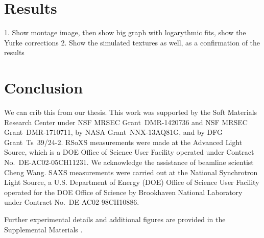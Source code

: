\documentclass[superscriptaddress,floatfix,draft,prl]{revtex4-1}
\begin{document}
\section{Results}
1. Show montage image, then show big graph with logarythmic fits, show the Yurke
corrections
2. Show the simulated textures as well, as a confirmation of the results
\section{Conclusion}
We can crib this from our thesis.
%
This work was supported by the Soft Materials Research Center under NSF MRSEC
Grant~DMR-1420736 and NSF MRSEC Grant~DMR-1710711, by NASA Grant~NNX-13AQ81G, and by DFG Grant~Ts~39/24-2.
RSoXS measurements were made at the Advanced Light Source, which is a DOE Office of Science User Facility operated under Contract No.~DE-AC02-05CH11231. We acknowledge the assistance of beamline scientist Cheng Wang.
SAXS measurements were carried out at the National Synchrotron Light Source, a U.S. Department of Energy (DOE) Office of Science User Facility operated for the DOE Office of Science by Brookhaven National Laboratory under Contract No.~DE-AC02-98CH10886.

Further experimental details and additional figures are provided in the Supplemental Materials \cite{supplement}.

\end{document}
